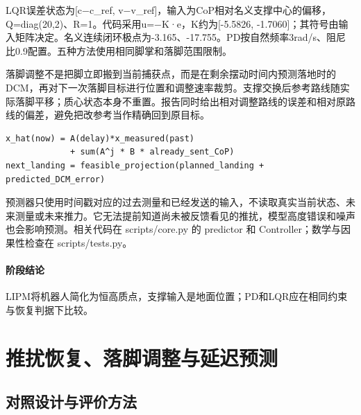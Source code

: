LQR误差状态为{[}c−c\_ref, v−v\_ref{]}，输入为CoP相对名义支撑中心的偏移，Q=diag(20,2)、R=1。代码采用u=−K·e，K约为{[}-5.5826, -1.7060{]}；其符号由输入矩阵决定。名义连续闭环极点为-3.165、-17.755。PD按自然频率3rad/s、阻尼比0.9配置。五种方法使用相同脚掌和落脚范围限制。

落脚调整不是把脚立即搬到当前捕获点，而是在剩余摆动时间内预测落地时的DCM，再对下一次落脚目标进行位置和调整速率裁剪。支撑交换后参考路线随实际落脚平移；质心状态本身不重置。报告同时给出相对调整路线的误差和相对原路线的偏差，避免把改参考当作精确回到原目标。

\begin{Verbatim}[breaklines=true,breakanywhere=true,fontsize=\footnotesize]
x_hat(now) = A(delay)*x_measured(past)
             + sum(A^j * B * already_sent_CoP)
next_landing = feasible_projection(planned_landing + predicted_DCM_error)
\end{Verbatim}

预测器只使用时间戳对应的过去测量和已经发送的输入，不读取真实当前状态、未来测量或未来推力。它无法提前知道尚未被反馈看见的推扰，模型高度错误和噪声也会影响预测。相关代码在 scripts/core.py 的 predictor 和 Controller；数学与因果性检查在 scripts/tests.py。


\paragraph{阶段结论}LIPM将机器人简化为恒高质点，支撑输入是地面位置；PD和LQR应在相同约束与恢复判据下比较。


\FloatBarrier

\section{推扰恢复、落脚调整与延迟预测}

\label{stage:s18}

\subsection{对照设计与评价方法}\label{s18-detail-1}

